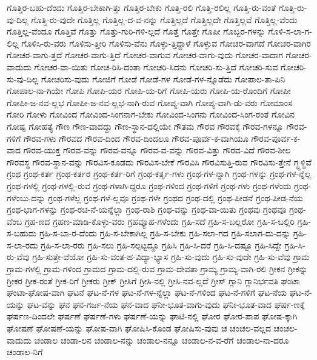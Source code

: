 {ಗೊತ್ತಿರ-ಬಹು-ದೆಂದು
ಗೊತ್ತಿರ-ಬೇಕಾಗಿ-ತ್ತು
ಗೊತ್ತಿರ-ಬೇಕು
ಗೊತ್ತಿ-ರಲಿ
ಗೊತ್ತಿ-ರಲಿಲ್ಲ
ಗೊತ್ತಿ-ರು-ವಂತೆ
ಗೊತ್ತಿ-ರು-ವು-ದಿಲ್ಲ
ಗೊತ್ತಿ-ರು-ವುದೇ
ಗೊತ್ತಿಲ್ಲ
ಗೊತ್ತಿಲ್ಲ-ದ-ವ-ನನ್ನು
ಗೊತ್ತಿಲ್ಲದೆ
ಗೊತ್ತಿಲ್ಲದೇ
ಗೊತ್ತಿಲ್ಲವೆ
ಗೊತ್ತಿಲ್ಲ-ವೆಂದು
ಗೊತ್ತಿಲ್ಲ-ವೆಂದೂ
ಗೊತ್ತಿವೆ
ಗೊತ್ತು
ಗೊತ್ತು-ಗುರಿ-ಗಳಿ-ಲ್ಲದೆ
ಗೊತ್ತೆ
ಗೊತ್ತೇ
ಗೊಪೀ
ಗೊಬ್ಬರ-ಗಳನ್ನು
ಗೊಳಿ-ಸ-ಲಾ-ಗ-ಲಿಲ್ಲ
ಗೊಳಿಸಿ-ರು-ವರು
ಗೊಳಿಸು-ತ್ತೀರಿ
ಗೊಳಿಸು-ವೆನು
ಗೊಳ್ಳು-ತ್ತಿದ್ದಾಳೆ
ಗೊಳ್ಳುವ
ಗೋಚರ-ವಾಗದೆ
ಗೋಚರ-ವಾಗಿರ
ಗೋಚರ-ವಾಗು-ತ್ತದೆ
ಗೋಚರ-ವಾಗು-ತ್ತಿದೆ
ಗೋಚರ-ವಾಗುವ
ಗೋಚರ-ವಾಗು-ವುದು
ಗೋಚರ-ವಾದಾಗ
ಗೋಚರ-ವಾದುದು
ಗೋಚರ-ವಾ-ಯಿತು
ಗೋಚ-ರಿಸಿ-ದಂತಾ
ಗೋಚರಿ-ಸಿದನು
ಗೋಚರಿ-ಸು-ತ್ತಿದೆ
ಗೋಚರಿ-ಸುವ
ಗೋಚರಿ-ಸು-ವು-ದಿಲ್ಲ
ಗೋಚರಿಸು-ವುದು
ಗೋಜಿಗೆ
ಗೋಡೆ
ಗೋಡೆ-ಗಳ
ಗೋಡೆ-ಗಳ-ನ್ನೊಡೆದು
ಗೋಪಾಲ-ತಾ-ಪಿನಿ
ಗೋಪಾಲ-ನಾ-ಗಿಯೇ
ಗೋಪಿ
ಗೋಪಿ-ಯರ
ಗೋಪಿ-ಯ-ರಿಗೆ
ಗೋಪಿ-ಯರು
ಗೋಪಿ-ಯ-ರೊಂದಿಗೆ
ಗೋಪೀ
ಗೋಪೀ-ಜ-ನವ-ಲ್ಲಭ
ಗೋಪೀ-ಜ-ನವ-ಲ್ಲಭ-ನಾಗಿ-ರುವ
ಗೋಪ್ಯ-ವಾಗಿ
ಗೋಪ್ಯ-ವಾಗಿ-ಡು-ವರು
ಗೋಮಾಂಸ
ಗೋರಿ
ಗೋಳು
ಗೋವಿಂದ
ಗೋವಿಂದ-ಸಿಂಗನಾಗ-ಬೇಕು
ಗೋವಿಂದ-ಸಿಂಗನು
ಗೋವಿಂದ-ಸಿಂಗ-ರಂತೆ
ಗೋವಿನ
ಗೋಷ್ಪ
ಗೋಹತ್ಯೆ
ಗೌಣ
ಗೌಣ-ವಾದದ್ದು
ಗೌಣ-ಸ್ಥಾನ-ದಲ್ಲಿಯೇ
ಗೌತಮ
ಗೌರವ
ಗೌರವಕ್ಕೆ
ಗೌರವ-ಗಳನ್ನೂ
ಗೌರವ-ಗಳಿಗೆ
ಗೌರವ-ಗಳು
ಗೌರವದ
ಗೌರವ-ದಿಂದ
ಗೌರವ-ದಿಂದಲೂ
ಗೌರವ-ಪೂರ್ವ-ಕ-ವಾಗಿಯೂ
ಗೌರವ-ಪೂರ್ವ-ಕ-ವಾದ
ಗೌರವ-ಯುಕ್ತ
ಗೌರವ-ವನ್ನು
ಗೌರವ-ವನ್ನೂ
ಗೌರವ-ವ-ವನ್ನು
ಗೌರವ-ವಿತ್ತು
ಗೌರವ-ವಿದೆ
ಗೌರವ-ಶೀಲ
ಗೌರವಸ್ಥ
ಗೌರವ-ಸ್ಥಾನ-ವನ್ನು
ಗೌರವಿಸ-ಕೂಡದು
ಗೌರವಿಸ-ಬೇಕೆ
ಗೌರವಿಸಿ
ಗೌರವಿಸುತ್ತಿ-ರುವ
ಗೌರವಿಸು-ತ್ತೇನೆ
ಗ್ಧ್ಧಳ್ಧಿವೆ
ಗ್ರಂಥ
ಗ್ರಂಥ-ಕರ್ತ
ಗ್ರಂಥ-ಕರ್ತರ
ಗ್ರಂಥ-ಕರ್ತ-ರಿಗೆ
ಗ್ರಂಥ-ಕರ್ತೃ-ಗಳು
ಗ್ರಂಥ-ಗಳ-ನ್ನಾಗಿ
ಗ್ರಂಥ-ಗಳನ್ನು
ಗ್ರಂಥ-ಗಳ-ನ್ನೆಲ್ಲ
ಗ್ರಂಥ-ಗಳಲ್ಲಿ
ಗ್ರಂಥ-ಗಳಲ್ಲಿ-ರುವ
ಗ್ರಂಥ-ಗಳಾಗಿ-ದ್ದರೂ
ಗ್ರಂಥ-ಗಳಿಂದ
ಗ್ರಂಥ-ಗಳಿಗೆ
ಗ್ರಂಥ-ಗಳು
ಗ್ರಂಥ-ಗಳೆಂದು
ಗ್ರಂಥ-ಗಳೆಂಬು-ದನ್ನು
ಗ್ರಂಥ-ಗಳೆಲ್ಲ
ಗ್ರಂಥ-ಗಳೆ-ಲ್ಲವೂ
ಗ್ರಂಥ-ಗಳೇ
ಗ್ರಂಥದ
ಗ್ರಂಥ-ದಲ್ಲಿ
ಗ್ರಂಥ-ಪೀಡನೆ
ಗ್ರಂಥ-ಪೀಡ-ನೆಯ
ಗ್ರಂಥ-ಭಾಗ-ಗಳನ್ನು
ಗ್ರಂಥ-ರಚ-ನೆ-ಯನ್ನೆಲ್ಲಾ
ಗ್ರಂಥ-ರಾಶಿ
ಗ್ರಂಥ-ವನ್ನು
ಗ್ರಂಥ-ವಾ-ಯಿತು
ಗ್ರಂಥವು
ಗ್ರಂಥವೂ
ಗ್ರಂಥ-ವೆಂಬ
ಗ್ರಹ-ಣದ
ಗ್ರಹಣ-ಮಾಡಿ-ಕೊಳ್ಳು-ವರು
ಗ್ರಹವ್ಯೂಹ-ಗಳೆಂದು
ಗ್ರಹಿ-ಸದೆ
ಗ್ರಹಿ-ಸ-ಬಲ್ಲರೋ
ಗ್ರಹಿ-ಸ-ಬಲ್ಲಿರಿ
ಗ್ರಹಿ-ಸ-ಬಹುದು
ಗ್ರಹಿ-ಸ-ಬಾ-ರ-ದೆಂದು
ಗ್ರಹಿ-ಸ-ಬೇಕಾಗಿಲ್ಲ
ಗ್ರಹಿ-ಸ-ಬೇಕು
ಗ್ರಹಿ-ಸಲಾ-ಗದ
ಗ್ರಹಿ-ಸಲಾಗ-ದು-ದನ್ನು
ಗ್ರಹಿ-ಸ-ಲಾ-ರದು
ಗ್ರಹಿ-ಸ-ಲಾ-ರರು
ಗ್ರಹಿ-ಸಲು
ಗ್ರಹಿ-ಸಲ್ಪಟ್ಟದ್ದೂ
ಗ್ರಹಿಸಿ
ಗ್ರಹಿ-ಸಿ-ದರೆ
ಗ್ರಹಿ-ಸಿ-ದಷ್ಟೂ
ಗ್ರಹಿ-ಸಿದ್ದೇ
ಗ್ರಹಿ-ಸಿ-ರು-ವೆವು
ಗ್ರಹಿ-ಸುತ್ತೇ-ವೆಯೋ
ಗ್ರಹಿ-ಸು-ವಂತ-ಹ-ವಿದ್ಯಾ-ಭ್ಯಾಸ
ಗ್ರಹಿ-ಸು-ವುದು
ಗ್ರಹಿ-ಸು-ವುದೇ
ಗ್ರಹಿ-ಸು-ವೆವು
ಗ್ರಾಮ
ಗ್ರಾಮ-ಗಳಲ್ಲಿ
ಗ್ರಾಮ-ಗಳಿಂದ
ಗ್ರಾಮದ
ಗ್ರಾಮ-ದಲ್ಲಿ-ರುವ
ಗ್ರಾಮ-ದೇವತಾ
ಗ್ರಾಮ್ಯ
ಗ್ರಾಮ್ಯ-ವಾಗಿ-ರಲಿ
ಗ್ರೀಕನ
ಗ್ರೀಕನ್ನು
ಗ್ರೀಕರ
ಗ್ರೀಕ-ರಂತೆ
ಗ್ರೀಕ-ರಿಗೆ
ಗ್ರೀಕರು
ಗ್ರೀಕ್
ಗ್ರೀಸಿಗೆ
ಗ್ರೀಸಿ-ನಲ್ಲಿ
ಗ್ರೀಸಿ-ನವ-ಲ್ಲದೆ
ಗ್ರೀಸ್
ಗ್ಲಾನಿ
ಗ್ಲಾನಿರ್ಭವತಿ
ಘಂಟಾ
ಘಂಟಾ-ಘೋಷ-ವಾಗಿ
ಘಟನೆ
ಘಟ-ನೆ-ಗಳ
ಘಟ-ನೆ-ಗಳ-ನ್ನೆಲ್ಲಾ
ಘಟ-ನೆ-ಗಳಿಂದ
ಘಟ-ನೆ-ಗಳಿಗೆ
ಘಟ-ನೆಯ
ಘಟ-ನೆ-ಯನ್ನು
ಘಟ-ವನ್ನು
ಘನ
ಘನ-ಗರ್ಜ-ನೆಯ
ಘನ-ವಾದ
ಘನೀ-ಭೂತ-ವಾಗು-ವುದು
ಘನೀ-ಭೂತ-ವಾದ
ಘರ್ಷ-ಣಕ್ಕೆ
ಘರ್ಷಣ-ದಿಂದಲೇ
ಘರ್ಷಣೆ
ಘರ್ಷಣೆ-ಗಳು
ಘರ್ಷಣೆ-ಯನ್ನು
ಘಾಟಿ-ನಲ್ಲಿ
ಘೋರ
ಘೋರ-ಪಾಪ
ಘೋಷ-ಕ್ಕಾಗಿ
ಘೋಷಣೆ
ಘೋಷಣೆ-ಯನ್ನು
ಘೋಷ-ವಾಗಿ
ಘೋಷಿಸಿ-ಕೊಂಡ
ಘೋಷಿಸು-ವುವು
ಚ
ಚಂಚಲ-ವಲ್ಲದ
ಚಂಚಲ-ವಾದುದು
ಚಂಡಾಲ
ಚಂಡಾ-ಲನ
ಚಂಡಾಲ-ನನ್ನು
ಚಂಡಾಲ-ನನ್ನೂ
ಚಂಡಾಲ-ನ-ವ-ರೆಗೆ
ಚಂಡಾಲ-ನಾ-ದರೂ
ಚಂಡಾಲ-ನಿಗೆ
}
